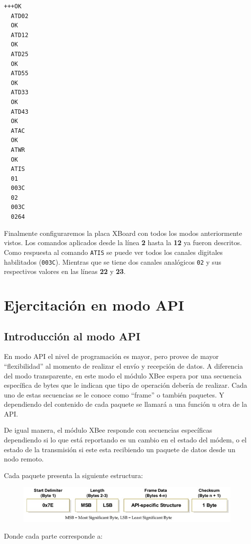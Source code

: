 \documentclass[11pt,oneside,spanish,a4paper]{article}
\begin{document}
\noindent\begin{minipage}{.35\textwidth}
\begin{lstlisting}[emph={+++,ATIS,ATD02,ATD12,ATD25,ATD55,ATD33,ATD43,ATWR,ATAC},
emphstyle={\color{blue}}, caption={GPIO de la placa XBoard.},label=code:completo]
  +++OK
  ATD02
  OK
  ATD12
  OK
  ATD25
  OK
  ATD55
  OK
  ATD33
  OK
  ATD43
  OK
  ATAC
  OK
  ATWR
  OK
  ATIS
  01
  003C
  02
  003C
  0264
\end{lstlisting}  
\end{minipage}\hfill
\begin{minipage}{.60\textwidth}
Finalmente configuraremos la placa XBoard con todos los modos
anteriormente vistos. Los comandos aplicados desde la línea \textbf{2}
hasta la \textbf{12} ya fueron descritos. Como respuesta al comando
\texttt{ATIS} se puede ver todos los canales digitales habilitados
(\texttt{003C}). Mientras que se tiene dos canales analógicos
\texttt{02} y sus respectivos valores en las líneas \textbf{22} y
\textbf{23}.
\end{minipage}
\section{Ejercitación en modo API}
\label{sec:API}

\subsection{Introducción al modo API}
En modo API el nivel de programación es mayor, pero provee de mayor
``flexibilidad'' al momento de realizar el envío y recepción de datos.
A diferencia del modo transparente, en este modo el módulo XBee espera
por una secuencia específica de bytes que le indican que tipo de
operación debería de realizar. Cada uno de estas secuencias se le
conoce como ``frame'' o también paquetes. Y dependiendo del contenido de
cada paquete se llamará a una función u otra de la API.

De igual manera, el módulo XBee responde con secuencias específicas
dependiendo si lo que está reportando es un cambio en el estado del
módem, o el estado de la transmisión si este esta recibiendo un
paquete de datos desde un nodo remoto.

Cada paquete presenta la siguiente estructura:
\begin{figure}[ht]
	\centering
	\includegraphics[width=.6\textwidth]{img/IMAGEN05.jpg}
\end{figure}
Donde cada parte corresponde a:
\end{document}
